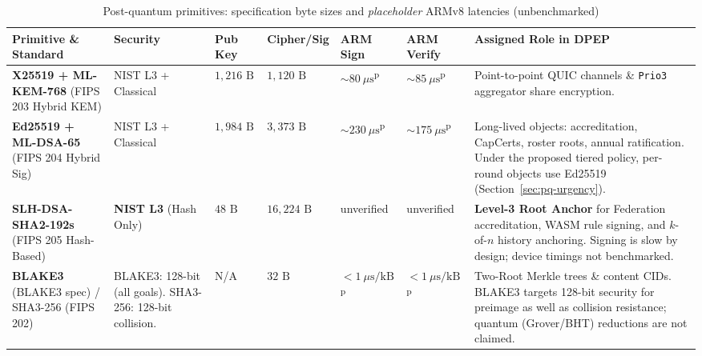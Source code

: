 \documentclass[10pt,twoside,openany]{book}
\theoremstyle{dpepstyle}
\begin{document}
\begin{table}[htbp]
\centering
\caption{Post-quantum primitives: specification byte sizes and \emph{placeholder} ARMv8 latencies (unbenchmarked)}
\label{tab:pqc-bench}
\scriptsize
\setlength{\tabcolsep}{2.8pt}
\begin{tabularx}{\textwidth}{L{1.12in} C{0.52in} R{0.44in} R{0.48in} R{0.48in} R{0.48in} Y}
\toprule
\textbf{Primitive \& Standard} & \textbf{Security} & \textbf{Pub Key} & \textbf{Cipher/Sig} & \textbf{ARM Sign} & \textbf{ARM Verify} & \textbf{Assigned Role in DPEP} \\
\midrule
\textbf{X25519 + ML-KEM-768} (FIPS 203 Hybrid KEM) & NIST L3 + Classical & $1,216\text{ B}$ & $1,120\text{ B}$ & $\sim 80\ \mu\text{s}$\textsuperscript{p} & $\sim 85\ \mu\text{s}$\textsuperscript{p} & Point-to-point QUIC channels \& \texttt{Prio3} aggregator share encryption. \\
\addlinespace[3pt]
\textbf{Ed25519 + ML-DSA-65} (FIPS 204 Hybrid Sig) & NIST L3 + Classical & $1,984\text{ B}$ & $3,373\text{ B}$ & $\sim 230\ \mu\text{s}$\textsuperscript{p} & $\sim 175\ \mu\text{s}$\textsuperscript{p} & Long-lived objects: accreditation, CapCerts, roster roots, annual ratification. Under the proposed tiered policy, per-round objects use Ed25519 (Section~\ref{sec:pq-urgency}). \\
\addlinespace[3pt]
\textbf{SLH-DSA-SHA2-192s} (FIPS 205 Hash-Based) & \textbf{NIST L3} (Hash Only) & $48\text{ B}$ & $16,224\text{ B}$ & unverified & unverified & \textbf{Level-3 Root Anchor} for Federation accreditation, WASM rule signing, and $k$-of-$n$ history anchoring. Signing is slow by design; device timings not benchmarked. \\
\addlinespace[3pt]
\textbf{BLAKE3} (BLAKE3 spec) / SHA3-256 (FIPS 202) & BLAKE3: 128-bit (all goals). SHA3-256: 128-bit collision. & N/A & $32\text{ B}$ & $<1\ \mu\text{s/kB}$\textsuperscript{p} & $<1\ \mu\text{s/kB}$\textsuperscript{p} & Two-Root Merkle trees \& content CIDs. BLAKE3 targets 128-bit security for preimage as well as collision resistance; quantum (Grover/BHT) reductions are not claimed. \\
\bottomrule
\end{tabularx}
\par{}
\end{table}
\end{document}
